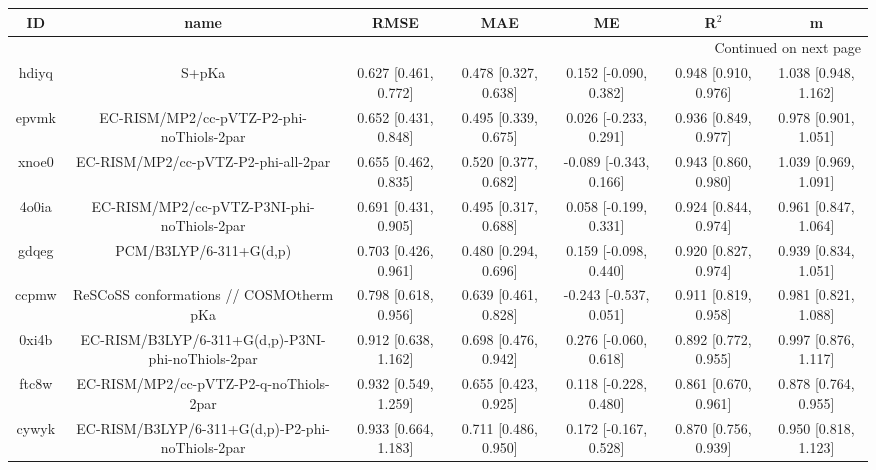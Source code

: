 \documentclass{article}
\begin{document}
\begin{center}
\begin{longtable}{|ccccccc|}
\toprule
    ID &                                               name &                  RMSE &                   MAE &                       ME &                 R$^2$ &                      m \\
\midrule
\endhead
\midrule
\multicolumn{7}{r}{{Continued on next page}} \\
\midrule
\endfoot

\bottomrule
\endlastfoot
 hdiyq &                                              S+pKa &  0.627 [0.461, 0.772] &  0.478 [0.327, 0.638] &    0.152 [-0.090, 0.382] &  0.948 [0.910, 0.976] &   1.038 [0.948, 1.162] \\
 epvmk &           EC-RISM/MP2/cc-pVTZ-P2-phi-noThiols-2par &  0.652 [0.431, 0.848] &  0.495 [0.339, 0.675] &    0.026 [-0.233, 0.291] &  0.936 [0.849, 0.977] &   0.978 [0.901, 1.051] \\
 xnoe0 &                EC-RISM/MP2/cc-pVTZ-P2-phi-all-2par &  0.655 [0.462, 0.835] &  0.520 [0.377, 0.682] &   -0.089 [-0.343, 0.166] &  0.943 [0.860, 0.980] &   1.039 [0.969, 1.091] \\
 4o0ia &         EC-RISM/MP2/cc-pVTZ-P3NI-phi-noThiols-2par &  0.691 [0.431, 0.905] &  0.495 [0.317, 0.688] &    0.058 [-0.199, 0.331] &  0.924 [0.844, 0.974] &   0.961 [0.847, 1.064] \\
 gdqeg &                             PCM/B3LYP/6-311+G(d,p) &  0.703 [0.426, 0.961] &  0.480 [0.294, 0.696] &    0.159 [-0.098, 0.440] &  0.920 [0.827, 0.974] &   0.939 [0.834, 1.051] \\
 ccpmw &            ReSCoSS conformations // COSMOtherm pKa &  0.798 [0.618, 0.956] &  0.639 [0.461, 0.828] &   -0.243 [-0.537, 0.051] &  0.911 [0.819, 0.958] &   0.981 [0.821, 1.088] \\
 0xi4b &  EC-RISM/B3LYP/6-311+G(d,p)-P3NI-phi-noThiols-2par &  0.912 [0.638, 1.162] &  0.698 [0.476, 0.942] &    0.276 [-0.060, 0.618] &  0.892 [0.772, 0.955] &   0.997 [0.876, 1.117] \\
 ftc8w &             EC-RISM/MP2/cc-pVTZ-P2-q-noThiols-2par &  0.932 [0.549, 1.259] &  0.655 [0.423, 0.925] &    0.118 [-0.228, 0.480] &  0.861 [0.670, 0.961] &   0.878 [0.764, 0.955] \\
 cywyk &    EC-RISM/B3LYP/6-311+G(d,p)-P2-phi-noThiols-2par &  0.933 [0.664, 1.183] &  0.711 [0.486, 0.950] &    0.172 [-0.167, 0.528] &  0.870 [0.756, 0.939] &   0.950 [0.818, 1.123] \\

\end{longtable}
\end{center}
\end{document}
